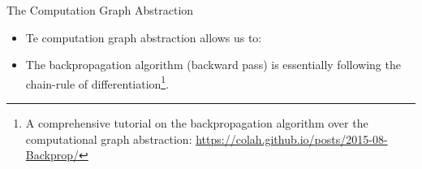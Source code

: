 \documentclass[handout]{beamer}
\begin{document}
\begin{frame}{The Computation Graph Abstraction}
\begin{scriptsize}
\begin{itemize}

\item  Te computation graph abstraction allows us to:


\begin{enumerate}
 \end{enumerate}
  
  
  
  
 \item The backpropagation algorithm (backward pass) is essentially following the chain-rule of differentiation\footnote{A comprehensive tutorial on the backpropagation algorithm over the computational graph abstraction: \url{https://colah.github.io/posts/2015-08-Backprop/}}.
 
  
\end{itemize}
\end{scriptsize}
\end{frame}
\end{document}
